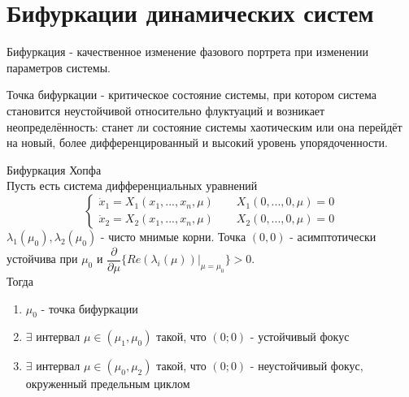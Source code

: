 %
%
%
%
%
% 
\section{Бифуркации динамических систем}
\begin{definition}
Бифуркация - качественное изменение фазового портрета при изменении параметров системы.
\end{definition}
\begin{definition}
  Точка бифуркации - критическое состояние системы, при котором система становится неустойчивой относительно флуктуаций и возникает неопределённость: станет ли состояние системы хаотическим или она перейдёт на новый, более дифференцированный и высокий уровень упорядоченности.
\end{definition}
\begin{theorem}{Бифуркация Хопфа}\\
  Пусть есть система дифференциальных уравнений
  \begin{equation}
    \begin{cases}
      \dot{x}_1=X_1(x_1,...,x_n,\mu) \qquad X_1(0,...,0,\mu)=0\\
      \dot{x}_2=X_2(x_1,...,x_n,\mu) \qquad X_2(0,...,0,\mu)=0
    \end{cases}
  \end{equation}
$\lambda_1(\mu_0),\lambda_2(\mu_0)$ - чисто мнимые корни. Точка $(0,0)$ - асимптотически устойчива при $\mu_0$ и
$\dfrac{\partial}{\partial \mu}\{Re(\lambda_i(\mu))|_{\mu=\mu_0}\}>0$.\\
Тогда \begin{enumerate}
  \item $\mu_0$ - точка бифуркации
  \item $\exists$ интервал $\mu\in(\mu_1,\mu_0)$ такой, что $(0;0)$ - устойчивый фокус
  \item $\exists$ интервал $\mu\in(\mu_0,\mu_2)$ такой, что $(0;0)$ - неустойчивый фокус, окруженный предельным циклом
\end{enumerate}
\end{theorem}

